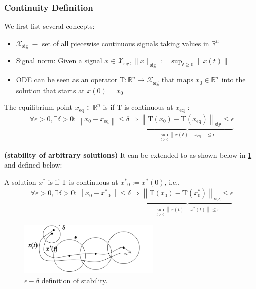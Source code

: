 \documentclass{article}
\newcommand{\bfs}[1]{\textbf{({#1}) }}
\begin{document}
\subsubsection{Continuity Definition}
\begin{defa}We first list several concepts:
\begin{itemize}
    \item $\mathcal{X}_{\text {sig }} \equiv$ set of all piecewise continuous signals taking values in $\mathbb{R}^{n}$
    \item Signal norm: Given a signal $x \in \mathcal{X}_{\mathrm{sig}},\|x\|_{\mathrm{sig}}:=\sup _{t \geq 0}\|x(t)\|$
    \item ODE can be seen as an operator
$\mathrm{T}: \mathbb{R}^{n} \rightarrow \mathcal{X}_{\mathrm{sig}}$ that maps $x_{0} \in \mathbb{R}^{n}$ into the solution that starts at $x(0)=x_{0}$
\end{itemize}
The equilibrium point $x_{\mathrm{eq}} \in \mathbb{R}^{n}$ is  if $\mathrm{T}$ is continuous at $x_{\mathrm{eq}}$ :
\begin{align*}
\forall \epsilon>0, \exists \delta>0:\left\|x_{0}-x_{\mathrm{eq}}\right\| \leq \delta \Longrightarrow \underbrace{\left\|\mathrm{T}\left(x_{0}\right)-\mathrm{T}\left(x_{\mathrm{eq}}\right)\right\|_{\mathrm{sig}} \leq \epsilon}_{\sup _{t \geq 0}\left\|x(t)-x_{\mathrm{eq}}\right\| \leq \epsilon}
\end{align*}
\end{defa}
\begin{rema}\bfs{stability of arbitrary solutions}
It can be extended to  as shown below in \cref{fig:stabanysolution} and defined below:

A solution $x^{*}$ is  if $\mathrm{T}$ is continuous at $x^{*}{ }_{0}:=x^{*}(0)$, i.e.,
\begin{align*}
\forall \epsilon>0, \exists \delta>0:\left\|x_{0}-x^{*}{ }_{0}\right\| \leq \delta \Longrightarrow \underbrace{\left\|\mathrm{T}\left(x_{0}\right)-\mathrm{T}\left(x_{0}^{*}\right)\right\|_{\operatorname{sig}} \leq \epsilon}_{\sup _{t \geq 0}\left\|x(t)-x^{*}(t)\right\| \leq \epsilon}
\end{align*}
\end{rema}
\begin{figure}[H]
    \centering
    \includegraphics[width=0.6\textwidth]{Figs/2.png}
    \caption{$\epsilon-\delta$ definition of stability.}
    \label{fig:stabanysolution}
\end{figure}
\end{document}
